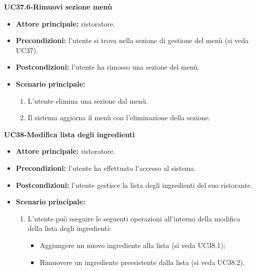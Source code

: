 \textbf{UC37.6-Rimuovi sezione menù}  
\begin{itemize}
    \item \textbf{Attore principale:} ristoratore.
    \item \textbf{Precondizioni:} l'utente si trova nella sezione di gestione del menù (si veda UC37).
    \item \textbf{Postcondizioni:} l'utente ha rimosso una sezione del menù.
    \item \textbf{Scenario principale:}
    \begin{enumerate}
        \item L'utente elimina una sezione dal menù.
        \item Il sistema aggiorna il menù con l'eliminazione della sezione.
    \end{enumerate}
\end{itemize}


\textbf{UC38-Modifica lista degli ingredienti}  
\begin{itemize}
    \item \textbf{Attore principale:} ristoratore.
    \item \textbf{Precondizioni:} l'utente ha effettuato l'accesso al sistema.
    \item \textbf{Postcondizioni:} l'utente gestisce la lista degli ingredienti del suo ristorante.
    \item \textbf{Scenario principale:}
    \begin{enumerate}
        \item L'utente può eseguire le seguenti operazioni all'interno della modifica della lista degli ingredienti:
        \begin{itemize}
           \item Aggiungere un nuovo ingrediente alla lista (si veda UC38.1);
           \item Rimuovere un ingrediente preesistente dalla lista (si veda UC38.2).
        \end{itemize}
    \end{enumerate}
\end{itemize}

